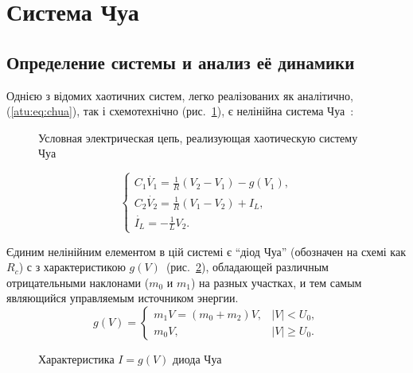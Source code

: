 
\FloatBarrier

\section{Система Чуа} %
\label{atu:sect:chua}


\subsection{Определение системы и анализ её динамики} %

Однією з відомих хаотичних систем, легко реалізованих як аналітично,
(\ref{atu:eq:chua}), так і схемотехнічно (рис.~\ref{atu:f:chuascheme}),
є нелінійна система Чуа~\cite{moon_chaotic_vibr,buga_chua,Kennedy92robustop,Kennedy_Chua_primer}:

\begin{figure}[htb!]
\begin{center}

\end{center}
\caption{Условная электрическая цепь, реализующая хаотическую систему Чуа}
\label{atu:f:chuascheme}
\end{figure}


\begin{equation}
\begin{cases}
  C_1 \dot{V_1}  = \frac{1}{R} ( V_2 - V_1 ) - g(V_1), \\
  C_2 \dot{V_2}  = \frac{1}{R} ( V_1 - V_2 ) + I_L, \\
  \dot{I_L}      = - \frac{1}{L} V_2 .
\end{cases}
\label{atu:eq:chua}
\end{equation}

Єдиним нелінійним елементом в цій системі є ``діод Чуа''
(обозначен на схемі как $R_c$) с
з характеристикою
$g(V)$~(рис.~\ref{atu:f:diodchua}),
%
обладающей различным отрицательными наклонами
($m_0$ и $m_1$) на разных участках,
и тем самым являющийся управляемым источником энергии.
%
%
\begin{equation}
g(V) =
\begin{cases}
  m_1 V = ( m_0 + m_2 ) V , & |V| <   U_0, \\
  m_0 V ,                   & |V| \ge U_0.
\end{cases}
\label{atu:eq:diodchua}
\end{equation}

\begin{figure}[htb!]
\begin{center}

\end{center}
\caption{Характеристика \(I=g(V)\) диода Чуа}
\label{atu:f:diodchua}
\end{figure}


